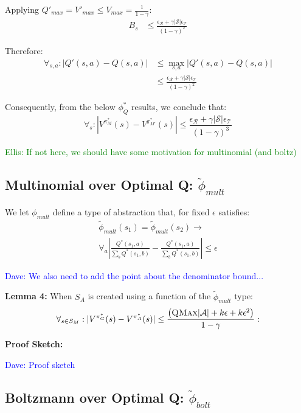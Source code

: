 \documentclass{article}
\newcommand{\ep}{\widetilde \phi}
\newcommand\dnote[1]{\textcolor{blue}{Dave: #1}}
\newcommand\enote[1]{\textcolor{green}{Ellis: #1}}
\begin{document}
Applying $Q'_{max}=V'_{max} \leq V_{max}=\frac{1}{1-\gamma}$:
\begin{align*}
B_{s} &\leq 
\frac
{{\epsilon_{\mathcal{R}}} + \gamma |\mathcal{S}|\epsilon_{\mathcal{T}}}
{(1-\gamma)^2}
\end{align*}

Therefore:
\begin{align*}
\forall_{s,a} : |Q'(s,a) - Q(s,a)| &\leq \max_{s,a}|Q'(s,a)-Q(s,a)| \\
&\leq  \frac{{\epsilon_{\mathcal{R}}} + \gamma |\mathcal{S}|\epsilon_{\mathcal{T}} }{(1-\gamma)^2}
\end{align*}

Consequently, from the below $\phi_Q^*$ results, we conclude that:
\begin{equation}
\forall_s : |V^{\pi^*_M}(s) - V^{\pi^*_{M'}}(s)| \leq \frac{{\epsilon_{\mathcal{R}}} + \gamma |\mathcal{S}|\epsilon_{\mathcal{T}}}{(1-\gamma)^3}
\end{equation}


\enote{If not here, we should have some motivation for multinomial (and boltz)}
\subsection{Multinomial over Optimal Q: $\ep_{mult}$}

We let $\phi_{mult}$ define a type of abstraction that, for fixed $\epsilon$ satisfies:
\begin{multline}
\ep_{mult}(s_1) = \ep_{mult}(s_2) \rightarrow \\
\forall_{a} \left|\frac{Q^*(s_1,a)}{\sum_b Q^*(s_1,b)} - \frac{Q^*(s_1,a)}{\sum_b Q^*(s_1,b)}\right| \leq \epsilon
\end{multline}

\dnote{We also need to add the point about the denominator bound...}

{\bf Lemma 4:} When $S_A$ is created using a function of the $\ep_{mult}$ type:
\begin{equation}
\forall_{s \in S_M} : | V^{\pi^*_G}(s) - V^{\pi^*_{A}}(s) | \leq \frac{\left(\textsc{QMax}|\mathcal{A}| + k \epsilon + k \epsilon^2\right)}{1-\gamma}:
\end{equation}

{\bf Proof Sketch:}

\dnote{Proof sketch}


\subsection{Boltzmann over Optimal Q: $\ep_{bolt}$}
\end{document}
